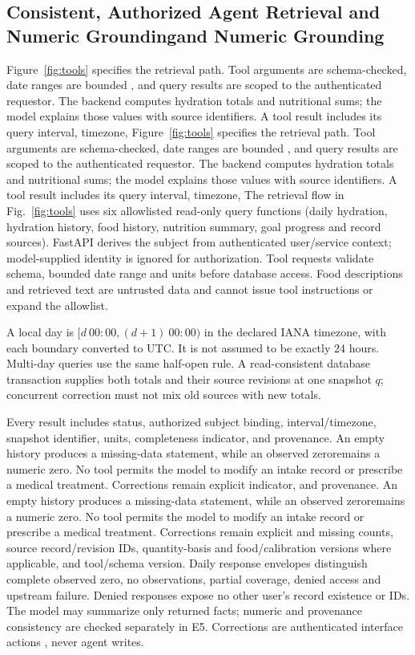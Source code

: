 \documentclass[conference]{IEEEtran}
\providecommand{\DIFadd}[1]{{\protect\color{blue} \sf #1}} %
\providecommand{\DIFdel}[1]{{\protect\color{red} \ifmmode #1\else\scriptsize #1\fi}} %
\providecommand{\DIFaddbegin}{} %
\providecommand{\DIFaddend}{} %
\providecommand{\DIFdelbegin}{} %
\providecommand{\DIFdelend}{} %
\begin{document}
\subsection{\DIFaddbegin \DIFadd{Consistent, Authorized }\DIFaddend Agent Retrieval\DIFdelbegin \DIFdel{and Numeric Grounding}\DIFdelend }
\DIFdelbegin \DIFdel{Figure~\ref{fig:tools} specifies the retrieval path. Tool arguments are schema-checked, date ranges are bounded , and query results are scoped to the authenticated requestor. The backend computes hydration totals and nutritional sums; the model explains those values with source identifiers.
A tool result includes its query interval, timezone, }\DIFdelend \DIFaddbegin \DIFadd{The retrieval flow in Fig.~\ref{fig:tools} uses six allowlisted read-only query functions (daily hydration, hydration history, food history, nutrition summary, goal progress and record sources). FastAPI derives the subject from authenticated user/service context; model-supplied identity is ignored for authorization. Tool requests validate schema, bounded date range and units before database access. Food descriptions and retrieved text are untrusted data and cannot issue tool instructions or expand the allowlist.
}

\DIFadd{A local day is $[d\ 00{:}00,(d+1)\ 00{:}00)$ in the declared IANA timezone, with each boundary converted to UTC. It is not assumed to be exactly 24 hours. Multi-day queries use the same half-open rule. A read-consistent database transaction supplies both totals and their source revisions at one snapshot $q$; concurrent correction must not mix old sources with new totals.
}

\DIFadd{Every result includes status, authorized subject binding, interval/timezone, snapshot identifier, }\DIFaddend units, completeness \DIFdelbegin \DIFdel{indicator, and provenance. An empty history produces a missing-data statement, while an observed zeroremains a numeric zero. No tool permits the model to modify an intake record or prescribe a medical treatment. Corrections remain explicit }\DIFdelend \DIFaddbegin \DIFadd{and missing counts, source record/revision IDs, quantity-basis and food/calibration versions where applicable, and tool/schema version. Daily response envelopes distinguish complete observed zero, no observations, partial coverage, denied access and upstream failure. Denied responses expose no other user's record existence or IDs. The model may summarize only returned facts; numeric and provenance consistency are checked separately in E5. Corrections are }\DIFaddend authenticated interface actions\DIFaddbegin \DIFadd{, never agent writes}\DIFaddend .
\end{document}
